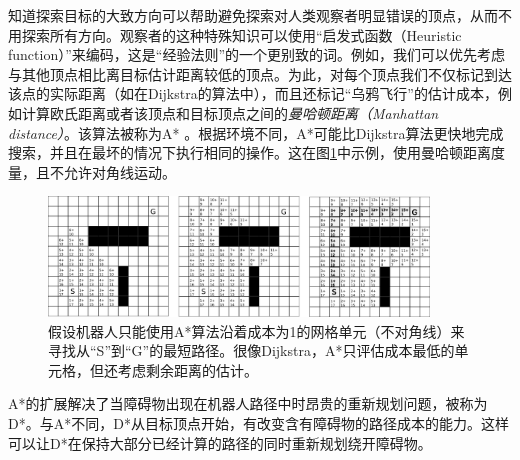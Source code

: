 知道探索目标的大致方向可以帮助避免探索对人类观察者明显错误的顶点，从而不用探索所有方向。观察者的这种特殊知识可以使用“启发式函数（Heuristic function）”来编码，这是“经验法则”的一个更别致的词。例如，我们可以优先考虑与其他顶点相比离目标估计距离较低的顶点。为此，对每个顶点我们不仅标记到达该点的实际距离（如在Dijkstra的算法中），而且还标记“乌鸦飞行”的估计成本，例如计算欧氏距离或者该顶点和目标顶点之间的\emph{曼哈顿距离（Manhattan distance）}。该算法被称为A* \cite{hart1968formal}。根据环境不同，A*可能比Dijkstra算法更快地完成搜索，并且在最坏的情况下执行相同的操作。这在图\ref{fig:astargrid}中示例，使用曼哈顿距离度量，且不允许对角线运动。


\begin{figure}[htb]
\centering
\includegraphics[width=0.9\textwidth]{figs/astargrid}
\caption{假设机器人只能使用A*算法沿着成本为1的网格单元（不对角线）来寻找从“S”到“G”的最短路径。很像Dijkstra，A*只评估成本最低的单元格，但还考虑剩余距离的估计。\label{fig:astargrid}}
\end{figure}


A*的扩展解决了当障碍物出现在机器人路径中时昂贵的重新规划问题，被称为D*\cite{stentz1994optimal}。与A*不同，D*从目标顶点开始，有改变含有障碍物的路径成本的能力。这样可以让D*在保持大部分已经计算的路径的同时重新规划绕开障碍物。


